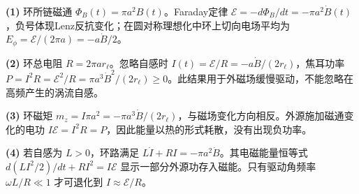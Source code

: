 \par\noindent\textbf{(1)} 环所链磁通 \(\Phi_B(t)=\pi a^2B(t)\)。Faraday定律 \(\mathcal E=-d\Phi_B/dt=-\pi a^2\dot B(t)\)，负号体现Lenz反抗变化；在圆对称理想化中环上切向电场平均为 \(E_\phi=\mathcal E/(2\pi a)=-a\dot B/2\)。
\par\noindent\textbf{(2)} 环总电阻 \(R=2\pi ar_\ell\)。忽略自感时 \(I(t)=\mathcal E/R=-a\dot B/(2r_\ell)\)，焦耳功率 \(P=I^2R=\mathcal E^2/R=\pi a^3\dot B^2/(2r_\ell)\ge0\)。此结果用于外磁场缓慢驱动，不能忽略在高频产生的涡流自感。
\par\noindent\textbf{(3)} 环磁矩 \(m_z=I\pi a^2=-\pi a^3\dot B/(2r_\ell)\)，与磁场变化方向相反。外源施加磁通变化的电功 \(I\mathcal E=I^2R=P\)，因此能量以热的形式耗散，没有出现负功率。
\par\noindent\textbf{(4)} 若自感为 \(L>0\)，环路满足 \(L\dot I+RI=-\pi a^2\dot B\)。其电磁能量恒等式 \(d(LI^2/2)/dt+RI^2=I\mathcal E\) 显示一部分外源功存入磁能。只有驱动角频率 \(\omega L/R\ll1\) 才可退化到 \(I\approx\mathcal E/R\)。
